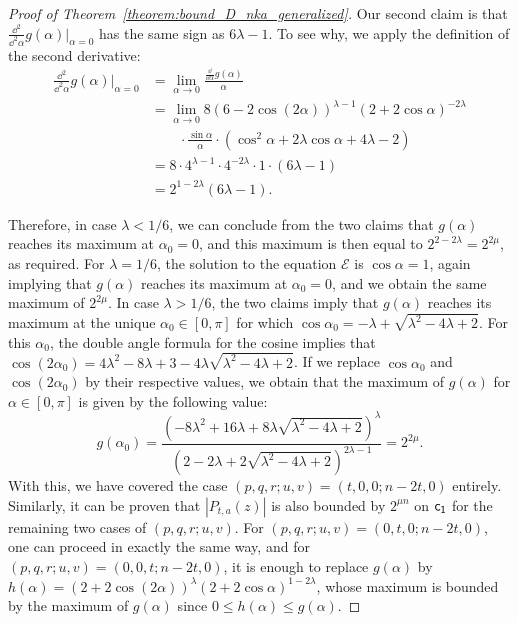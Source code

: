 \documentclass{llncs}
\begin{document}
\begin{proof}[Proof of Theorem~\ref{theorem:bound_D_nka_generalized}]
    Our second claim is that $\frac{\dd^2}{\dd^2\alpha}g(\alpha)\vert_{\alpha=0}$ has the same sign as $6\lambda -1$. To see why, we apply the definition of the second derivative:
    \begin{align*}
        \frac{\dd^2}{\dd^2\alpha}g(\alpha)\vert_{\alpha=0}
        &=\lim_{\alpha\to 0}\frac{\frac{\dd}{\dd\alpha}g(\alpha)}{\alpha}\\
        &=\lim_{\alpha\to 0}8(6-2\cos(2\alpha))^{\lambda-1}(2+2\cos\alpha)^{-2\lambda}\\
		&\qquad\cdot\frac{\sin\alpha}{\alpha}\cdot\left(\cos^2\alpha+2\lambda\cos\alpha+4\lambda-2\right)\\
        &=8\cdot4^{\lambda-1}\cdot 4^{-2\lambda}\cdot 1\cdot(6\lambda -1)\\
        &=2^{1-2\lambda}(6\lambda -1).
    \end{align*}
    
    Therefore, in case $\lambda<1/6$, we can conclude from the two claims that $g(\alpha)$ reaches its maximum at $\alpha_0=0$, and this maximum is then equal to $2^{2-2\lambda}=2^{2\mu}$, as required. For $\lambda=1/6$, the solution to the equation $\mathcal E$ is $\cos\alpha=1$, again implying that $g(\alpha)$ reaches its maximum at $\alpha_0=0$, and we obtain the same maximum of $2^{2\mu}$. In case $\lambda>1/6$, the two claims imply that $g(\alpha)$ reaches its maximum at the unique $\alpha_0\in[0,\pi]$ for which $\cos\alpha_0=-\lambda+\sqrt{\lambda^2-4\lambda+2}$. For this $\alpha_0$, the double angle formula for the cosine implies that $\cos(2\alpha_0)=4\lambda^2-8\lambda+3-4\lambda\sqrt{\lambda^2-4\lambda+2}$. If we replace $\cos\alpha_0$ and $\cos(2\alpha_0)$ by their respective values, we obtain that the maximum of $g(\alpha)$ for $\alpha\in[0,\pi]$ is given by the following value:
    \[
        g(\alpha_0)=\frac{\left(-8\lambda^2+16\lambda+8\lambda\sqrt{\lambda^2-4\lambda+2}\right)^{\lambda}}{\left(2-2\lambda+2\sqrt{\lambda^2-4\lambda+2}\right)^{2\lambda-1}}=2^{2\mu}.
    \]
    With this, we have covered the case $(p,q,r;u,v)=(t,0,0;n-2t,0)$ entirely. Similarly, it can be proven that $|P_{t,a}(z)|$ is also bounded by $2^{\mu n}$ on $\mathsf{c_1}$ for the remaining two cases of $(p,q,r;u,v)$. For $(p,q,r;u,v)=(0,t,0;n-2t,0)$, one can proceed in exactly the same way, and for $(p,q,r;u,v)=(0,0,t;n-2t,0)$, it is enough to replace $g(\alpha)$ by $h(\alpha)=(2+2\cos(2\alpha))^\lambda(2+2\cos\alpha)^{1-2\lambda}$, whose maximum is bounded by the maximum of $g(\alpha)$ since $0\leq h(\alpha)\leq g(\alpha)$.
\end{proof}
\end{document}
